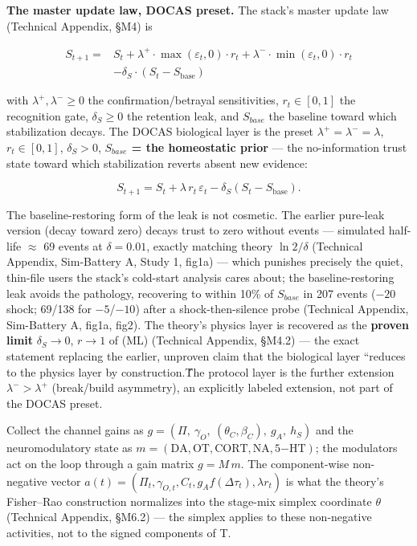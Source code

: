 \documentclass[
]{article}
\begin{document}
\textbf{The master update law, DOCAS preset.} The stack's master update
law (Technical Appendix, §M4) is

\begin{equation}
\begin{split}
S_{t+1} = {}& S_t + \lambda^{+}\!\cdot\max(\varepsilon_t, 0)\cdot r_t + \lambda^{-}\!\cdot\min(\varepsilon_t, 0)\cdot r_t\\
&- \delta_S\cdot(S_t - S_{\mathrm{base}})
\end{split}
\tag{ML}\label{eq:ml}
\end{equation}

with \(\lambda^{+}, \lambda^{-} \geq 0\) the confirmation/betrayal
sensitivities, \(r_t \in [0,1]\) the recognition gate,
\(\delta_S \geq 0\) the retention leak, and \(S_{base}\) the baseline
toward which stabilization decays. The DOCAS biological layer is the
preset \(\lambda^{+} = \lambda^{-} = \lambda\), \(r_t \in [0,1]\),
\(\delta_S > 0\), \textbf{\(S_{base}\) = the homeostatic prior} --- the
no-information trust state toward which stabilization reverts absent new
evidence:

\begin{equation}
S_{t+1} = S_t + \lambda\, r_t\, \varepsilon_t - \delta_S (S_t - S_{\mathrm{base}}).
\tag{DOCAS preset}\label{eq:preset}
\end{equation}

The baseline-restoring form of the leak is not cosmetic. The earlier
pure-leak version (decay toward zero) decays trust to zero without
events --- simulated half-life \(\approx\) 69 events at
\(\delta = 0.01\), exactly matching theory \(\ln 2/\delta\) (Technical
Appendix, Sim-Battery A, Study 1, fig1a) --- which punishes precisely
the quiet, thin-file users the stack's cold-start analysis cares about;
the baseline-restoring leak avoids the pathology, recovering to within
10\% of \(S_{base}\) in 207 events (\(-20\) shock; 69/138 for
\(-5\)/\(-10\)) after a shock-then-silence probe (Technical Appendix,
Sim-Battery A, fig1a, fig2). The theory's physics layer is recovered as
the \textbf{proven limit} \(\delta_S \to 0\), \(r \to 1\) of (ML)
(Technical Appendix, §M4.2) --- the exact statement replacing the
earlier, unproven claim that the biological layer ``reduces to the
physics layer by construction.T́́he protocol layer is the further
extension \(\lambda^{-} > \lambda^{+}\) (break/build asymmetry), an
explicitly labeled extension, not part of the DOCAS preset.

Collect the channel gains as
\(g = (\Pi,\ \gamma_O,\ (\theta_C, \beta_C),\ g_A,\ h_S)\) and the
neuromodulatory state as
\(m = (\mathrm{DA}, \mathrm{OT}, \mathrm{CORT}, \mathrm{NA}, \mathrm{5\mathord{-}HT})\);
the modulators act on the loop through a gain matrix \(g = M\,m\). The
component-wise non-negative vector
\(a(t) = (\Pi_t, \gamma_{O,t}, C_t, g_A f(\Delta\tau_t), \lambda r_t)\)
is what the theory's Fisher--Rao construction normalizes into the
stage-mix simplex coordinate \(\theta\) (Technical Appendix, §M6.2) ---
the simplex applies to these non-negative activities, not to the signed
components of T.
\end{document}
